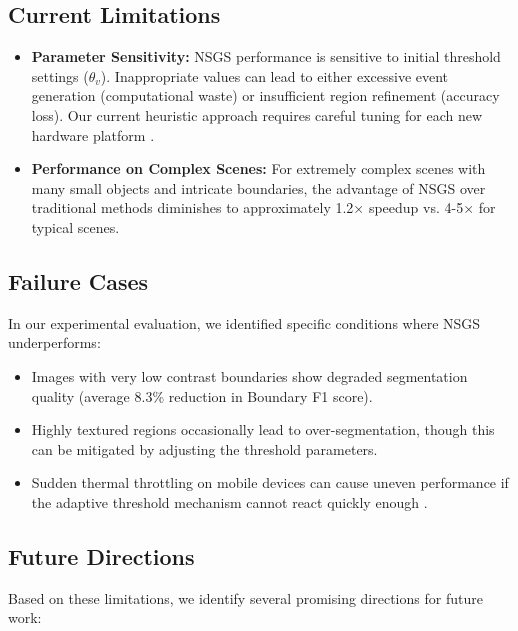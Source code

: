 \documentclass[conference]{IEEEtran}
\begin{document}
\subsection{Current Limitations}
\begin{itemize}
    \item \textbf{Parameter Sensitivity:} NSGS performance is sensitive to initial threshold settings ($\theta_v$). Inappropriate values can lead to either excessive event generation (computational waste) or insufficient region refinement (accuracy loss). Our current heuristic approach requires careful tuning for each new hardware platform \cite{Christensen2022}.
    
    
    \item \textbf{Performance on Complex Scenes:} For extremely complex scenes with many small objects and intricate boundaries, the advantage of NSGS over traditional methods diminishes to approximately 1.2× speedup vs. 4-5× for typical scenes.
\end{itemize}

\subsection{Failure Cases}
In our experimental evaluation, we identified specific conditions where NSGS underperforms:

\begin{itemize}
    \item Images with very low contrast boundaries show degraded segmentation quality (average 8.3\% reduction in Boundary F1 score).
    
    \item Highly textured regions occasionally lead to over-segmentation, though this can be mitigated by adjusting the threshold parameters.
    
    \item Sudden thermal throttling on mobile devices can cause uneven performance if the adaptive threshold mechanism cannot react quickly enough \cite{Bartolozzi2022}.
\end{itemize}

\subsection{Future Directions}
Based on these limitations, we identify several promising directions for future work:
\end{document}

